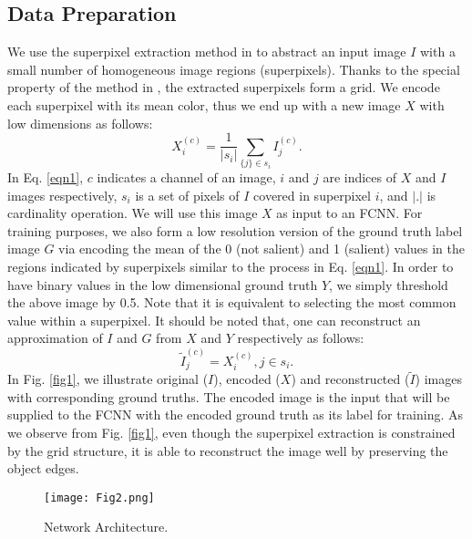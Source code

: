 \documentclass[a4paper,conference]{IEEEtran}
\begin{document}
\subsection{Data Preparation}
We use the superpixel extraction method in \cite{Fu} to abstract an input image $ I $ with a small number of homogeneous image regions (superpixels). 
Thanks to the special property of the method in \cite{Fu}, the extracted superpixels form a grid. 
We encode each superpixel with its mean color, thus we end up with a new image $ X $ with low dimensions as follows:
\begin{equation}
X^{(c)}_{i}=\frac{1}{|s_{i}|}\sum_{\{j\}\in s_{i}}I^{(c)}_{j}.
\label{eqn1}
\end{equation}
In Eq. \ref{eqn1}, $ c $ indicates a channel of an image, $ i $ and $ j $ are indices of $ X $ and $ I $ images respectively, $ s_{i} $ is a set of pixels of $ I $ covered in superpixel $ i $, and $ |.| $ is cardinality operation.
We will use this image $ X $ as input to an FCNN. 
For training purposes, we also form a low resolution version of the ground truth label image $ G $ via encoding the mean of the 0 (not salient) and 1 (salient) values in the regions indicated by superpixels similar to the process in Eq. \ref{eqn1}.
In order to have binary values in the low dimensional ground truth $ Y $, we simply threshold the above image by 0.5. Note that it is equivalent to selecting the most common value within a superpixel.
It should be noted that, one can reconstruct an approximation of $ I $ and $ G $ from $ X $ and $ Y $ respectively as follows:
\begin{equation}
\tilde{I}^{(c)}_{j}=X^{(c)}_{i}, j\in s_{i}.
\label{eqn2}
\end{equation}
In Fig. \ref{fig1}, we illustrate original ($ I $), encoded ($ X $) and reconstructed ($ \tilde{I} $) images with corresponding ground truths. 
The encoded image is the input that will be supplied to the FCNN with the encoded ground truth as its label for training. 
As we observe from Fig. \ref{fig1}, even though the superpixel extraction is constrained by the grid structure, it is able to reconstruct the image well by preserving the object edges.


\begin{figure}[!t]
\centering
\texttt{[image: Fig2.png]}
\caption{Network Architecture.}
\label{fig2}
\end{figure}
\end{document}
